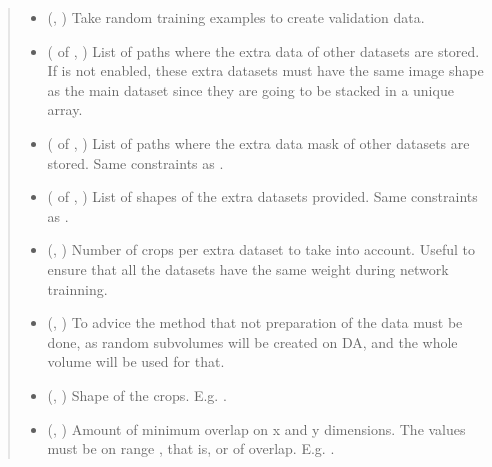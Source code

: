 \documentclass[letterpaper,10pt,english]{sphinxmanual}
\begin{document}
\begin{fulllineitems}
\begin{quote}
\begin{description}
\begin{itemize}
\item {} 
 (, ) \textendash{} Take random training examples to create validation data.

\item {} 
 ( of , ) \textendash{} List of paths where the extra data of other datasets are stored. If  is not enabled, these
extra datasets must have the same image shape as the main dataset since they are going to be stacked in a
unique array.

\item {} 
 ( of , ) \textendash{} List of paths where the extra data mask of other datasets are stored. Same constraints as .

\item {} 
 ( of , ) \textendash{} List of shapes of the extra datasets provided. Same constraints as .

\item {} 
 (, ) \textendash{} Number of crops per extra dataset to take into account. Useful to ensure that all the datasets have the same
weight during network trainning.

\item {} 
 (, ) \textendash{} To advice the method that not preparation of the data must be done, as random subvolumes will be created on
DA, and the whole volume will be used for that.

\item {} 
 (, ) \textendash{} Shape of the crops. E.g. .

\item {} 
 (, ) \textendash{} Amount of minimum overlap on x and y dimensions. The values must be on range \sphinxcode{\sphinxupquote{{[}0, 1)}}, that is,  or
 of overlap. E.g. .


\end{itemize}
\end{description}
\end{quote}
\end{fulllineitems}
\end{document}

